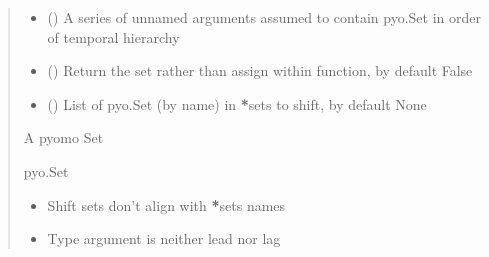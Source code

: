 \documentclass[letterpaper,10pt,english]{sphinxmanual}
\begin{document}
\begin{fulllineitems}
\begin{fulllineitems}
\begin{quote}
\begin{description}
\begin{itemize}
\item {} 
\sphinxAtStartPar
{} () \textendash{} A series of unnamed arguments assumed to contain pyo.Set in order of temporal hierarchy

\item {} 
\sphinxAtStartPar
{} (\sphinxstyleliteralemphasis{\sphinxupquote{ | }}\sphinxstyleliteralemphasis{\sphinxupquote{, }}) \textendash{} Return the set rather than assign within function, by default False

\item {} 
\sphinxAtStartPar
{} (\sphinxstyleliteralemphasis{\sphinxupquote{ | }}\sphinxstyleliteralemphasis{\sphinxupquote{, }}) \textendash{} List of pyo.Set (by name) in {\color{red}\bfseries{}*}sets to shift, by default None

\end{itemize}

\sphinxAtStartPar
A pyomo Set

\sphinxAtStartPar
pyo.Set

\begin{itemize}
\item {} 
\sphinxAtStartPar
{} \textendash{} Shift sets don’t align with {\color{red}\bfseries{}*}sets names

\item {} 
\sphinxAtStartPar
{} \textendash{} Type argument is neither lead nor lag

\end{itemize}

\end{description}\end{quote}

\end{fulllineitems}



\end{fulllineitems}
\end{document}
